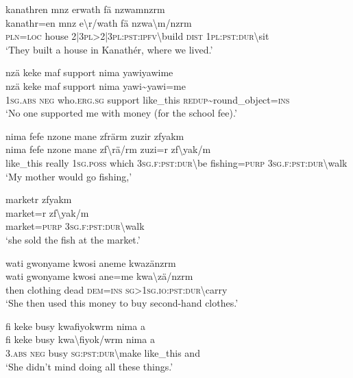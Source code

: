 \ea\label{ex:14:a3122}
kanathren mnz erwath fä nzwamnzrm\\
\gll kanathr=en	mnz	e{\textbackslash}r/wath	fä	nzwa{\textbackslash}m/nzrm\\
     \textsc{pln}=\textsc{loc}	house	2|3\textsc{pl}>2|3\textsc{pl}:\textsc{pst}:\textsc{ipfv}{\textbackslash}build	\textsc{dist}	1\textsc{pl}:\textsc{pst}:\textsc{dur}{\textbackslash}sit\\
\glt `They built a house in Kanathér, where we lived.'
\z

\ea\label{ex:14:a3124}
nzä keke maf support nima yawiyawime\\
\gll nzä	keke	maf	support	nima	yawi{\textasciitilde}yawi=me\\
     1\textsc{sg}.\textsc{abs}	\textsc{neg}	who.\textsc{erg}.\textsc{sg}	support	like\_this	\textsc{redup}{\textasciitilde}round\_object=\textsc{ins}\\
\glt `No one supported me with money (for the school fee).'
\z

\ea\label{ex:14:a3126}
nima fefe nzone mane zfrärm zuzir zfyakm\\
\gll nima	fefe	nzone	mane	zf{\textbackslash}rä/rm	zuzi=r	zf{\textbackslash}yak/m\\
     like\_this	really	1\textsc{sg}.\textsc{poss}	which	3\textsc{sg}.\textsc{f}:\textsc{pst}:\textsc{dur}{\textbackslash}be	fishing=\textsc{purp}	3\textsc{sg}.\textsc{f}:\textsc{pst}:\textsc{dur}{\textbackslash}walk\\
\glt `My mother would go fishing,'
\z

\ea\label{ex:14:a3128}
marketr zfyakm\\
\gll market=r	zf{\textbackslash}yak/m\\
     market=\textsc{purp}	3\textsc{sg}.\textsc{f}:\textsc{pst}:\textsc{dur}{\textbackslash}walk\\
\glt `she sold the fish at the market.'
\z

\ea\label{ex:14:a3129}
wati gwonyame kwosi aneme kwazänzrm\\
\gll wati	gwonyame	kwosi	ane=me	kwa{\textbackslash}zä/nzrm\\
     then	clothing	dead	\textsc{dem}=\textsc{ins}	\textsc{sg}>1\textsc{sg}.\textsc{io}:\textsc{pst}:\textsc{dur}{\textbackslash}carry\\
\glt `She then used this money to buy second-hand clothes.'
\z

\ea\label{ex:14:a3130}
fi keke busy kwafiyokwrm nima a\\
\gll fi	keke	busy	kwa{\textbackslash}fiyok/wrm	nima	a\\
     3.\textsc{abs}	\textsc{neg}	busy	\textsc{sg}:\textsc{pst}:\textsc{dur}{\textbackslash}make	like\_this	and\\
\glt `She didn't mind doing all these things.'
\z

